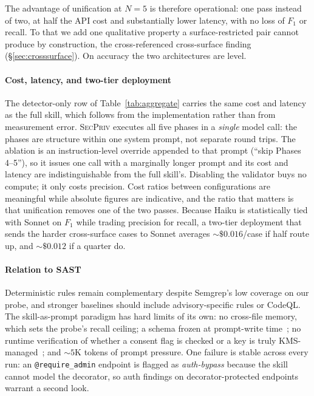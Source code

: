 \documentclass[runningheads]{llncs}
\begin{document}
The advantage of unification at $N{=}5$ is therefore operational: one pass instead of two, at half the API cost and substantially lower latency, with no loss of $F_1$ or recall. To that we add one qualitative property a surface-restricted pair cannot produce by construction, the cross-referenced cross-surface finding (\S\ref{sec:crosssurface}). On accuracy the two architectures are level.

\paragraph{Cost, latency, and two-tier deployment} The detector-only row of Table~\ref{tab:aggregate} carries the same cost and latency as the full skill, which follows from the implementation rather than from measurement error. \textsc{SecPriv} executes all five phases in a \emph{single} model call: the phases are structure within one system prompt, not separate round trips. The ablation is an instruction-level override appended to that prompt (``skip Phases 4--5''), so it issues one call with a marginally longer prompt and its cost and latency are indistinguishable from the full skill's. Disabling the validator buys no compute; it only costs precision. Cost ratios between configurations are meaningful while absolute figures are indicative, and the ratio that matters is that unification removes one of the two passes. Because Haiku is statistically tied with Sonnet on $F_1$ while trading precision for recall, a two-tier deployment that sends the harder cross-surface cases to Sonnet averages $\sim\!\$0.016$/case if half route up, and $\sim\!\$0.012$ if a quarter do.

\paragraph{Relation to SAST} Deterministic rules remain complementary despite Semgrep's low coverage on our probe, and stronger baselines should include advisory-specific rules or CodeQL. The skill-as-prompt paradigm has hard limits of its own: no cross-file memory, which sets the probe's recall ceiling; a schema frozen at prompt-write time~\cite{ji2023survey}; no runtime verification of whether a consent flag is checked or a key is truly KMS-managed~\cite{pearce2022examining}; and $\sim\!5$K tokens of prompt pressure. One failure is stable across every run: an \texttt{@require\_admin} endpoint is flagged as \emph{auth-bypass} because the skill cannot model the decorator, so auth findings on decorator-protected endpoints warrant a second look.
\end{document}
